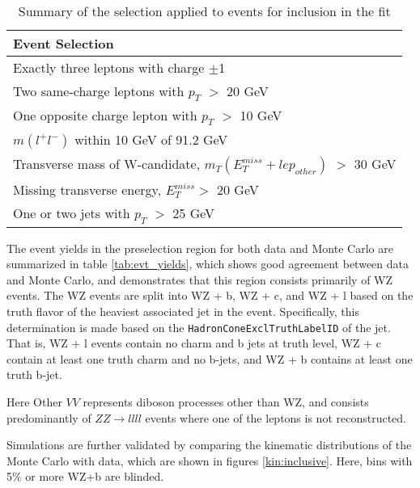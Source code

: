 \begin{table}[H]
    \centering
    \begin{tabular}{l}
        \hline\hline
        Event Selection\\
        \hline 
        Exactly three leptons with charge $\pm$1 \\
        Two same-charge leptons with $p_T$ $>$ 20 GeV \\
        One opposite charge lepton with $p_T$ $>$ 10 GeV \\
        $m(l^+l^-)$ within 10 GeV of 91.2 GeV \\
        Transverse mass of W-candidate, $m_T(E_T^{miss} + lep_{other})$ $>$ 30 GeV \\
        Missing transverse energy, $E_T^{miss} >$ 20 GeV \\
        One or two jets with $p_T$ $>$ 25 GeV \\
        \hline\hline
    \end{tabular}
    \caption{Summary of the selection applied to events for inclusion in the fit}
    \label{tbl:selection}
\end{table}

The event yields in the preselection region for both data and Monte Carlo are summarized in table \ref{tab:evt_yields}, which shows good agreement between data and Monte Carlo, and demonstrates that this region consists primarily of WZ events. The WZ events are split into WZ + b, WZ + c, and WZ + l based on the truth flavor of the heaviest associated jet in the event. Specifically, this determination is made based on the \verb!HadronConeExclTruthLabelID! of the jet. That is, WZ + l events contain no charm and b jets at truth level, WZ + c contain at least one truth charm and no b-jets, and WZ + b contains at least one truth b-jet. 

\begin{table}[H]
    \centering
        
    \label{tab:evt_yields}
\end{table}

Here Other $VV$ represents diboson processes other than WZ, and consists predominantly of $ZZ\rightarrow llll$ events where one of the leptons is not reconstructed.

Simulations are further validated by comparing the kinematic distributions of the Monte Carlo with data, which are shown in figures \ref{kin:inclusive}. Here, bins with 5\% or more WZ+b are blinded.


